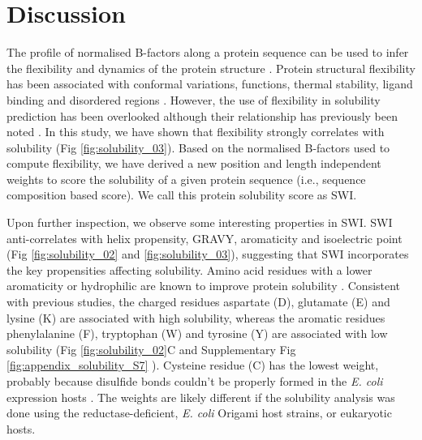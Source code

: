 \section{Discussion}
The profile of normalised B-factors along a protein sequence can be used to infer the flexibility and dynamics of the protein structure \citep{Karplus1985-ea,vihinen1994accuracy}. Protein structural flexibility has been associated with conformal variations, functions, thermal stability, ligand binding and disordered regions \citep{Vihinen1987-jo,Teague2003-vq,Radivojac2004-ff,Ma2005-cr,Schlessinger2005-ps,Yuan2005-gl,Yin2011-su}. However, the use of flexibility in solubility prediction has been overlooked although their relationship has previously been noted \citep{Tsumoto2003-qp}. In this study, we have shown that flexibility strongly correlates with solubility (Fig \ref{fig:solubility_03}). Based on the normalised B-factors used to compute flexibility, we have derived a new position and length independent weights to score the solubility of a given protein sequence  (i.e., sequence composition based score). We call this protein solubility score as SWI.



Upon further inspection, we observe some interesting properties in SWI. SWI anti-correlates with helix propensity, GRAVY, aromaticity and isoelectric point (Fig \ref{fig:solubility_02} and \ref{fig:solubility_03}), suggesting that SWI incorporates the key propensities affecting solubility. Amino acid residues with a lower aromaticity or hydrophilic are known to improve protein solubility \citep{Wilkinson1991-zp,Trevino2007-on,Niwa2009-ye,Kramer2012-wk,Warwicker2014-nh,han2019improve}. Consistent with previous studies, the charged residues aspartate (D), glutamate (E) and lysine (K) are associated with high solubility, whereas the aromatic residues phenylalanine (F), tryptophan (W) and tyrosine (Y) are associated with low solubility (Fig \ref{fig:solubility_02}C and Supplementary Fig \ref{fig:appendix_solubility_S7} ). Cysteine residue (C) has the lowest weight, probably because disulfide bonds couldn’t be properly formed in the \textit{E. coli} expression hosts \citep{Stewart1998-dn,Aslund1999-jl,Rosano2014-oq,jia2016high}. The weights are likely different if the solubility analysis was done using the reductase-deficient, \textit{E. coli} Origami host strains, or eukaryotic hosts.


